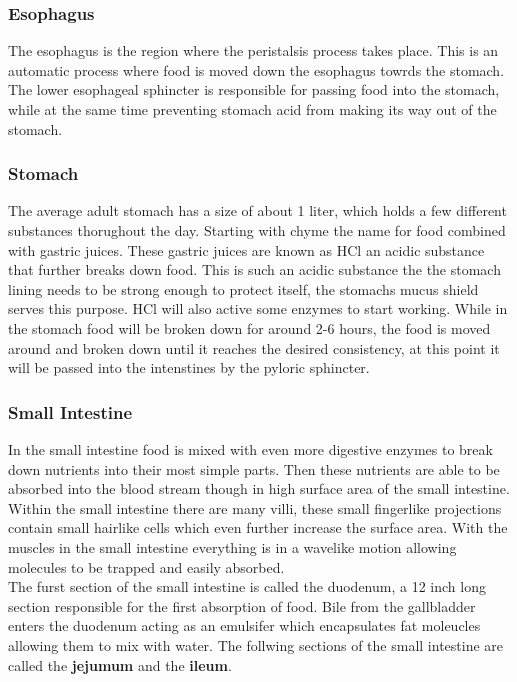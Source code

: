 \documentclass[letterpaper, 11pt]{article}
\begin{document}
\subsubsection{Esophagus}
\label{sec:orga89ed4b}
The esophagus is the region where the peristalsis process takes place. This is an automatic process where food is moved down the esophagus towrds the stomach. The lower esophageal sphincter is responsible for passing food into the stomach, while at the same time preventing stomach acid from making its way out of the stomach.\\
\subsubsection{Stomach}
\label{sec:org412d459}
The average adult stomach has a size of about 1 liter, which holds a few different substances thorughout the day. Starting with chyme the name for food combined with gastric juices. These gastric juices are known as HCl an acidic substance that further breaks down food. This is such an acidic substance the the stomach lining needs to be strong enough to protect itself, the stomachs mucus shield serves this purpose. HCl will also active some enzymes to start working. While in the stomach food will be broken down for around 2-6 hours, the food is moved around and broken down until it reaches the desired consistency, at this point it will be passed into the intenstines by the pyloric sphincter.\\
\subsubsection{Small Intestine}
\label{sec:orga846c14}
In the small intestine food is mixed with even more digestive enzymes to break down nutrients into their most simple parts. Then these nutrients are able to be absorbed into the blood stream though in high surface area of the small intestine. Within the small intestine there are many villi, these small fingerlike projections contain small hairlike cells which even further increase the surface area. With the muscles in the small intestine everything is in a wavelike motion allowing molecules to be trapped and easily absorbed.\\
The furst section of the small intestine is called the duodenum, a 12 inch long section responsible for the first absorption of food. Bile from the gallbladder enters the duodenum acting as an emulsifer which encapsulates fat moleucles allowing them to mix with water. The follwing sections of the small intestine are called the \textbf{jejumum} and the \textbf{ileum}.\\
\end{document}
